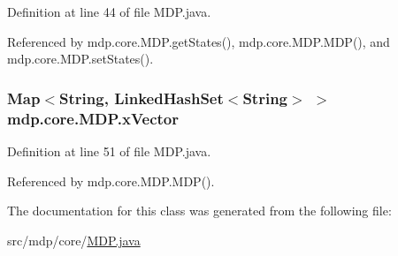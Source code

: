 Definition at line 44 of file M\+D\+P.\+java.



Referenced by mdp.\+core.\+M\+D\+P.\+get\+States(), mdp.\+core.\+M\+D\+P.\+M\+D\+P(), and mdp.\+core.\+M\+D\+P.\+set\+States().

\hypertarget{classmdp_1_1core_1_1_m_d_p_a073e9c6d6e349ae034c3cf220d754324}{}
\subsubsection[{x\+Vector}]{\setlength{\rightskip}{0pt plus 5cm}Map$<$String, Linked\+Hash\+Set$<$String$>$ $>$ mdp.\+core.\+M\+D\+P.\+x\+Vector\hspace{0.3cm}{\ttfamily [private]}}\label{classmdp_1_1core_1_1_m_d_p_a073e9c6d6e349ae034c3cf220d754324}


Definition at line 51 of file M\+D\+P.\+java.



Referenced by mdp.\+core.\+M\+D\+P.\+M\+D\+P().



The documentation for this class was generated from the following file\+:\begin{DoxyCompactItemize}
\item 
src/mdp/core/\hyperlink{_m_d_p_8java}{M\+D\+P.\+java}\end{DoxyCompactItemize}

